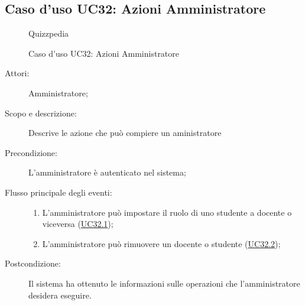 \subsection{Caso d'uso UC32: Azioni Amministratore}
        \begin{figure}[H]
            \centering
            \begin{resizedtikzpicture}{\textwidth}
		\begin{umlsystem}[x=0, fill=lightgray!20]{Quizzpedia}
		\end{umlsystem}
            \end{resizedtikzpicture}
            \caption{Caso d'uso UC32: Azioni Amministratore}
            \label{fig:UC32} 
        \end{figure}
    \begin{description}
\item[Attori:] Amministratore;
\item[Scopo e descrizione:] Descrive le azione che può compiere un aministratore
      \item[Precondizione:] L'amministratore è autenticato nel sistema;

        \item[Flusso principale degli eventi:] \begin{enumerate}
          \item L'amministratore può impostare il ruolo di uno studente a docente o viceversa (\hyperlink{UC32.1}{UC32.1});
          \item L'amministratore può rimuovere un docente o studente (\hyperlink{UC32.2}{UC32.2});

      \end{enumerate}
    \item[Postcondizione:] Il sistema ha ottenuto le informazioni sulle operazioni che l’amministratore desidera eseguire.
  \end{description}
\hypertarget{UC32.1}{}
